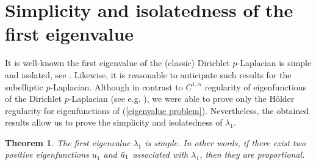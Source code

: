 \documentclass[a4paper,12pt,reqno]{amsart}
\renewcommand\eqref[1]{(\ref{#1})} %
\numberwithin{equation}{section}
\theoremstyle{plain}
\newtheorem{theorem}{Theorem}[section]
\theoremstyle{definition}
\begin{document}
\section{Simplicity and isolatedness of the first eigenvalue}\label{sec4}
It is well-known the first eigenvalue of the (classic) Dirichlet $p$-Laplacian is simple and isolated, see \cite{Lin1990}. Likewise, it is reasonable to anticipate such results for the subelliptic $p$-Laplacian. Although in contrast to $C^{1,\alpha}$ regularity of eigenfunctions of the Dirichlet $p$-Laplacian (see e.g. \cite{dibenedetto1983}), we were able to prove only the H\"older regularity  for eigenfunctions of \eqref{eigenvalue problem}. Nevertheless, the obtained results allow us to prove the simplicity and isolatedness of $\lambda_{1}$.
\begin{theorem}\label{simplicity theorem}
The first eigenvalue $\lambda_{1}$ is simple. In other words, if there exist two positive eigenfunctions $u_{1}$ and $\Tilde{u}_{1}$ associated with $\lambda_{1}$, then they are proportional.
\end{theorem}
\end{document}
